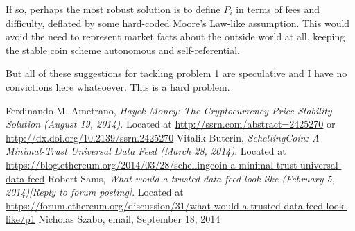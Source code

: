 \documentclass[twocolumn]{article}
\begin{document}
If so, perhaps the most robust solution is to define $P_{i}$ in terms
of fees and difficulty, deflated by some hard-coded Moore's Law-like
assumption. This would avoid the need to represent market facts about
the outside world at all, keeping the stable coin scheme autonomous
and self-referential. 

But all of these suggestions for tackling problem 1 are speculative
and I have no convictions here whatsoever. This is a hard problem.

\begin{thebibliography}{9}
Ferdinando M. Ametrano,
  \emph{Hayek Money: The Cryptocurrency Price Stability Solution
    (August 19, 2014)}.
Located at \url{http://ssrn.com/abstract=2425270} or
\url{http://dx.doi.org/10.2139/ssrn.2425270}
Vitalik Buterin, \emph{SchellingCoin: A Minimal-Trust Universal Data Feed (March 28,
  2014)}. Located at
\url{https://blog.ethereum.org/2014/03/28/schellingcoin-a-minimal-trust-universal-data-feed}
Robert Sams, \emph{What would a trusted data feed look like (February 5,
  2014)[Reply to forum posting]}. Located at
\url{https://forum.ethereum.org/discussion/31/what-would-a-trusted-data-feed-look-like/p1}
Nicholas Szabo, email, September 18, 2014
  \end{thebibliography}
\end{document}
